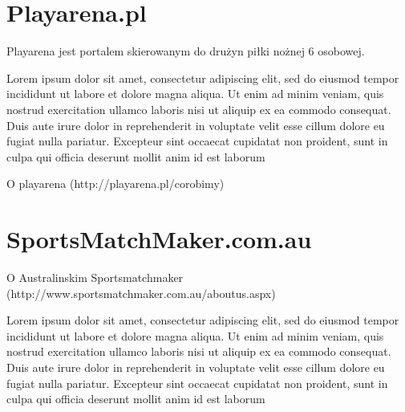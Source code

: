 \section{Playarena.pl}

Playarena jest portalem skierowanym do drużyn piłki nożnej 6 osobowej. 

Lorem ipsum dolor sit amet, consectetur adipiscing elit, sed do eiusmod tempor incididunt ut labore et dolore magna aliqua. Ut enim ad minim veniam, quis nostrud exercitation ullamco laboris nisi ut aliquip ex ea commodo consequat. Duis aute irure dolor in reprehenderit in voluptate velit esse cillum dolore eu fugiat nulla pariatur. Excepteur sint occaecat cupidatat non proident, sunt in culpa qui officia deserunt mollit anim id est laborum

O playarena (http://playarena.pl/corobimy)



\section{SportsMatchMaker.com.au}

O Australinskim Sportsmatchmaker (http://www.sportsmatchmaker.com.au/aboutus.aspx)

Lorem ipsum dolor sit amet, consectetur adipiscing elit, sed do eiusmod tempor incididunt ut labore et dolore magna aliqua. Ut enim ad minim veniam, quis nostrud exercitation ullamco laboris nisi ut aliquip ex ea commodo consequat. Duis aute irure dolor in reprehenderit in voluptate velit esse cillum dolore eu fugiat nulla pariatur. Excepteur sint occaecat cupidatat non proident, sunt in culpa qui officia deserunt mollit anim id est laborum